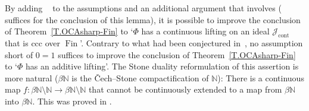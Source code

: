\documentclass{amsart}
\def\Fin{{\rm Fin}}   %
\def\text{\mbox}
\theoremstyle{definition}
\theoremstyle{remark}
\def\Fin{\operatorname{Fin}}
\DeclareMathOperator{\Ccont}{cont}
\newcommand{\Jcont}{\cJ_{\Ccont}}
\newcommand{\bbN}{\mathbb N}
\newcommand{\cJ}{{\mathcal J}} %
\DeclareMathOperator{\MAsigma}{MA(\sigma-\text{linked})}
\numberwithin{claim}{subsection}
\begin{document}
By adding $\MAsigma$ to the assumptions and an additional argument that involves \cite[Lemma~2.3]{Ve:OCA} ($\MAsigma$ suffices for the conclusion of this lemma), it is possible to improve the conclusion of Theorem~\ref{T.OCAsharp-Fin} to 
`$\Phi$ has a continuous lifting on an ideal $\Jcont$ that is ccc over $\Fin$'.  
Contrary to what had been conjectured in~\cite{Fa:AQ}, no assumption short of $0=1$ suffices to improve the conclusion of Theorem~\ref{T.OCAsharp-Fin} to `$\Phi$ has an additive lifting'. The Stone duality reformulation of this assertion is more natural ($\beta\bbN$ is the \v Cech--Stone compactification of $\bbN$): There is a continuous map $f\colon \beta\bbN\setminus \bbN\to \beta\bbN\setminus \bbN$ that cannot be continuously extended to a map from $\beta\bbN$ into $\beta\bbN$. 
This was proved in \cite{dow2014non}. 





\end{document}
